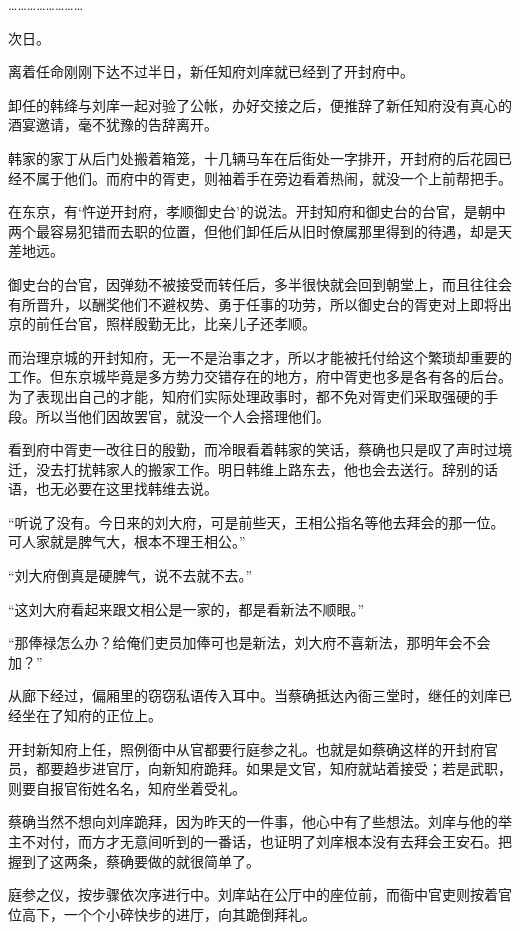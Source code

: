 ……………………

次日。

离着任命刚刚下达不过半日，新任知府刘庠就已经到了开封府中。

卸任的韩绛与刘庠一起对验了公帐，办好交接之后，便推辞了新任知府没有真心的酒宴邀请，毫不犹豫的告辞离开。

韩家的家丁从后门处搬着箱笼，十几辆马车在后街处一字排开，开封府的后花园已经不属于他们。而府中的胥吏，则袖着手在旁边看着热闹，就没一个上前帮把手。

在东京，有‘忤逆开封府，孝顺御史台’的说法。开封知府和御史台的台官，是朝中两个最容易犯错而去职的位置，但他们卸任后从旧时僚属那里得到的待遇，却是天差地远。

御史台的台官，因弹劾不被接受而转任后，多半很快就会回到朝堂上，而且往往会有所晋升，以酬奖他们不避权势、勇于任事的功劳，所以御史台的胥吏对上即将出京的前任台官，照样殷勤无比，比亲儿子还孝顺。

而治理京城的开封知府，无一不是治事之才，所以才能被托付给这个繁琐却重要的工作。但东京城毕竟是多方势力交错存在的地方，府中胥吏也多是各有各的后台。为了表现出自己的才能，知府们实际处理政事时，都不免对胥吏们采取强硬的手段。所以当他们因故罢官，就没一个人会搭理他们。

看到府中胥吏一改往日的殷勤，而冷眼看着韩家的笑话，蔡确也只是叹了声时过境迁，没去打扰韩家人的搬家工作。明日韩维上路东去，他也会去送行。辞别的话语，也无必要在这里找韩维去说。

“听说了没有。今日来的刘大府，可是前些天，王相公指名等他去拜会的那一位。可人家就是脾气大，根本不理王相公。”

“刘大府倒真是硬脾气，说不去就不去。”

“这刘大府看起来跟文相公是一家的，都是看新法不顺眼。”

“那俸禄怎么办？给俺们吏员加俸可也是新法，刘大府不喜新法，那明年会不会加？”

从廊下经过，偏厢里的窃窃私语传入耳中。当蔡确抵达內衙三堂时，继任的刘庠已经坐在了知府的正位上。

开封新知府上任，照例衙中从官都要行庭参之礼。也就是如蔡确这样的开封府官员，都要趋步进官厅，向新知府跪拜。如果是文官，知府就站着接受；若是武职，则要自报官衔姓名名，知府坐着受礼。

蔡确当然不想向刘庠跪拜，因为昨天的一件事，他心中有了些想法。刘庠与他的举主不对付，而方才无意间听到的一番话，也证明了刘庠根本没有去拜会王安石。把握到了这两条，蔡确要做的就很简单了。

庭参之仪，按步骤依次序进行中。刘庠站在公厅中的座位前，而衙中官吏则按着官位高下，一个个小碎快步的进厅，向其跪倒拜礼。

